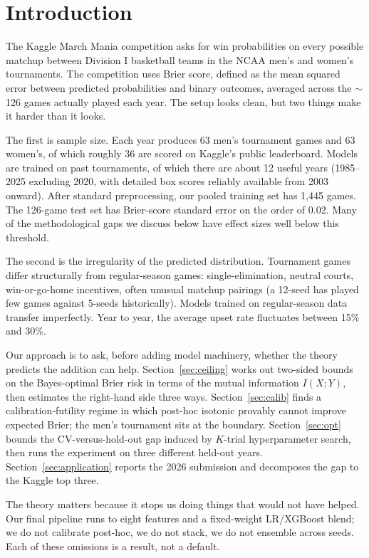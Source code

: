 \documentclass[11pt,a4paper]{article}
\theoremstyle{definition}
\begin{document}
\section{Introduction}

The Kaggle March Mania competition asks for win probabilities on every possible matchup between Division I basketball teams in the NCAA men's and women's tournaments. The competition uses Brier score, defined as the mean squared error between predicted probabilities and binary outcomes, averaged across the $\sim$126 games actually played each year. The setup looks clean, but two things make it harder than it looks.

The first is sample size. Each year produces 63 men's tournament games and 63 women's, of which roughly 36 are scored on Kaggle's public leaderboard. Models are trained on past tournaments, of which there are about 12 useful years (1985--2025 excluding 2020, with detailed box scores reliably available from 2003 onward). After standard preprocessing, our pooled training set has 1{,}445 games. The 126-game test set has Brier-score standard error on the order of $0.02$. Many of the methodological gaps we discuss below have effect sizes well below this threshold.

The second is the irregularity of the predicted distribution. Tournament games differ structurally from regular-season games: single-elimination, neutral courts, win-or-go-home incentives, often unusual matchup pairings (a 12-seed has played few games against 5-seeds historically). Models trained on regular-season data transfer imperfectly. Year to year, the average upset rate fluctuates between 15\% and 30\%.

Our approach is to ask, before adding model machinery, whether the theory predicts the addition can help. Section~\ref{sec:ceiling} works out two-sided bounds on the Bayes-optimal Brier risk in terms of the mutual information $I(X;Y)$, then estimates the right-hand side three ways. Section~\ref{sec:calib} finds a calibration-futility regime in which post-hoc isotonic provably cannot improve expected Brier; the men's tournament sits at the boundary. Section~\ref{sec:opt} bounds the CV-versus-hold-out gap induced by $K$-trial hyperparameter search, then runs the experiment on three different held-out years. Section~\ref{sec:application} reports the 2026 submission and decomposes the gap to the Kaggle top three.

The theory matters because it stops us doing things that would not have helped. Our final pipeline runs to eight features and a fixed-weight LR/XGBoost blend; we do not calibrate post-hoc, we do not stack, we do not ensemble across seeds. Each of these omissions is a result, not a default.
\end{document}
